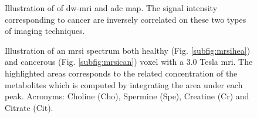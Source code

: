 \begin{figure}
  \hspace*{\fill}
  \caption{Illustration of of \ac{dw}-\ac{mri} and \ac{adc} map. The signal intensity corresponding to cancer are inversely correlated on these two types of imaging techniques.}
  \label{fig:dwi}
\end{figure}


\begin{figure}
  \centering
  \hspace*{\fill}
   \hfill
  \hspace*{\fill}
  \caption{Illustration of an \ac{mrsi} spectrum both healthy (Fig. \ref{subfig:mrsihea}) and cancerous (Fig. \ref{subfig:mrsican}) voxel with a 3.0 Tesla \ac{mri}. The highlighted areas corresponds to the related concentration of the metabolites which is computed by integrating the area under each peak. Acronyms: Choline (Cho), Spermine (Spe), Creatine (Cr) and Citrate (Cit).}
  \label{fig:mrsi}
\end{figure}


